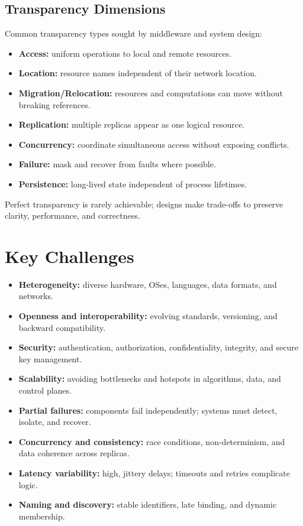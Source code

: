 \subsection{Transparency Dimensions}
Common transparency types sought by middleware and system design:
\begin{itemize}
  \item \textbf{Access:} uniform operations to local and remote resources.
  \item \textbf{Location:} resource names independent of their network location.
  \item \textbf{Migration/Relocation:} resources and computations can move without breaking references.
  \item \textbf{Replication:} multiple replicas appear as one logical resource.
  \item \textbf{Concurrency:} coordinate simultaneous access without exposing conflicts.
  \item \textbf{Failure:} mask and recover from faults where possible.
  \item \textbf{Persistence:} long-lived state independent of process lifetimes.
\end{itemize}
Perfect transparency is rarely achievable; designs make trade-offs to preserve clarity, performance, and correctness.

\section{Key Challenges}
\begin{itemize}
  \item \textbf{Heterogeneity:} diverse hardware, OSes, languages, data formats, and networks.
  \item \textbf{Openness and interoperability:} evolving standards, versioning, and backward compatibility.
  \item \textbf{Security:} authentication, authorization, confidentiality, integrity, and secure key management.
  \item \textbf{Scalability:} avoiding bottlenecks and hotspots in algorithms, data, and control planes.
  \item \textbf{Partial failures:} components fail independently; systems must detect, isolate, and recover.
  \item \textbf{Concurrency and consistency:} race conditions, non-determinism, and data coherence across replicas.
  \item \textbf{Latency variability:} high, jittery delays; timeouts and retries complicate logic.
  \item \textbf{Naming and discovery:} stable identifiers, late binding, and dynamic membership.
\end{itemize}

